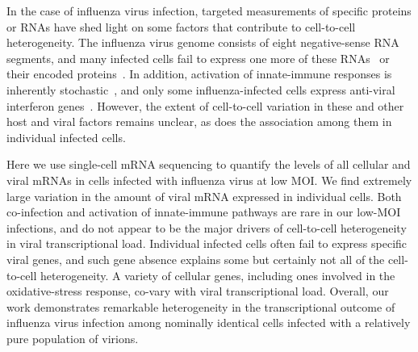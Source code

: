 \documentclass[9pt,lineno]{elife}
\begin{document}
In the case of influenza virus infection, targeted measurements of specific proteins or RNAs have shed light on some factors that contribute to cell-to-cell heterogeneity. 
The influenza virus genome consists of eight negative-sense RNA segments, and many infected cells fail to express one more of these RNAs~\citep{Heldt:2015iz,Dou:2017cp} or their encoded proteins~\citep{Brooke:2013kb}.
In addition, activation of innate-immune responses is inherently stochastic~\citep{shalek2013single,shalek2014single,bhushal2017cell,hagai2017gene}, and only some influenza-infected cells express anti-viral interferon genes~\citep{PerezCidoncha:2014jr,Killip:2017ef}.
However, the extent of cell-to-cell variation in these and other host and viral factors remains unclear, as does the association among them in individual infected cells.

Here we use single-cell mRNA sequencing to quantify the levels of all cellular and viral mRNAs in cells infected with influenza virus at low MOI.
We find extremely large variation in the amount of viral mRNA expressed in individual cells.
Both co-infection and activation of innate-immune pathways are rare in our low-MOI infections, and do not appear to be the major drivers of cell-to-cell heterogeneity in viral transcriptional load.
Individual infected cells often fail to express specific viral genes, and such gene absence explains some but certainly not all of the cell-to-cell heterogeneity.
A variety of cellular genes, including ones involved in the oxidative-stress response, co-vary with viral transcriptional load.
Overall, our work demonstrates remarkable heterogeneity in the transcriptional outcome of influenza virus infection among nominally identical cells infected with a relatively pure population of virions.
\end{document}
